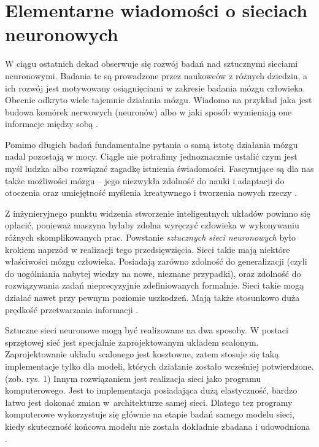 \chapter{Elementarne wiadomości o sieciach neuronowych}

W ciągu ostatnich dekad obserwuje się rozwój badań nad sztucznymi sieciami neuronowymi. Badania te są prowadzone przez naukowców z różnych dziedzin, a ich rozwój jest motywowany osiągnięciami w zakresie badania mózgu człowieka. Obecnie odkryto wiele tajemnic działania mózgu. Wiadomo na przykład jaka jest budowa komórek nerwowych (neuronów) albo w jaki sposób wymieniają one informacje między sobą \citep[s. 13]{Kosinski2017}.

Pomimo długich badań fundamentalne pytania o samą istotę działania mózgu nadal pozostają w mocy. Ciągle nie potrafimy jednoznacznie ustalić czym jest myśl ludzka albo rozwiązać  zagadkę istnienia świadomości. Fascynujące są dla nas także możliwości mózgu -- jego niezwykła zdolność do nauki i adaptacji do otoczenia oraz umiejętność myślenia kreatywnego i tworzenia nowych rzeczy \citep[s. 14]{Kosinski2017}.

Z inżynieryjnego punktu widzenia stworzenie inteligentnych układów powinno się opłacić, ponieważ maszyna byłaby zdolna wyręczyć człowieka w wykonywaniu różnych skomplikowanych prac. Powstanie \textit{sztucznych sieci neuronowych} było krokiem naprzód w realizacji tego przedsięwzięcia. Sieci takie mają niektóre właściwości mózgu człowieka. Posiadają zarówno zdolność do generalizacji (czyli do uogólniania nabytej wiedzy na nowe, nieznane przypadki), oraz zdolność do rozwiązywania zadań nieprecyzyjnie zdefiniowanych formalnie. Sieci takie mogą działać nawet przy pewnym poziomie uszkodzeń. Mają także stosunkowo duża prędkość przetwarzania informacji \citep[s. 15-16]{Kosinski2017}.

Sztuczne sieci neuronowe mogą być realizowane na dwa sposoby. W postaci sprzętowej sieć jest specjalnie zaprojektowanym układem scalonym. Zaprojektowanie układu scalonego jest kosztowne, zatem stosuje się taką implementacje tylko dla modeli, których działanie zostało wcześniej potwierdzone. (zob. rys. 1) Innym rozwiązaniem jest realizacja sieci jako programu komputerowego. Jest to implementacja posiadająca dużą elastyczność, bardzo łatwo jest dokonać zmian w~architekturze samej sieci. Dlatego tez programy komputerowe wykorzystuje się głównie na etapie badań samego modelu sieci, kiedy skuteczność końcowa modelu nie została dokładnie zbadana i udowodniona \citep[s. 15]{Kosinski2017}.

